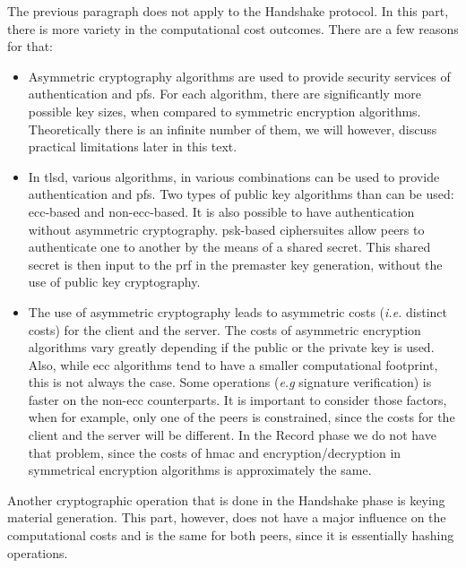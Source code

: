 \documentclass{llncs}
\begin{document}
The previous paragraph does not apply to the Handshake protocol. In this part, there is more variety in the
computational cost outcomes. There are a few reasons for that:

\begin{itemize}

  \item Asymmetric cryptography algorithms are used to provide security services of authentication
  and \gls{pfs}. For each algorithm, there are significantly more possible key sizes, when compared to
  symmetric encryption algorithms. Theoretically there is an infinite number of them, we will however, discuss
  practical limitations later in this text.

  \item In \gls{tlsd}, various algorithms, in various combinations can be used to provide authentication and \gls{pfs}.
  Two types of public key algorithms than can be used: \gls{ecc}-based and non-\gls{ecc}-based. It is also possible
  to have authentication without asymmetric cryptography. \gls{psk}-based ciphersuites allow peers to
  authenticate one to another by the means of a shared secret. This shared secret is then input to the \gls{prf}
  in the premaster key generation, without the use of public key cryptography.

  \item The use of asymmetric cryptography leads to asymmetric costs (\textit{i.e.} distinct costs) for the client and the server. The costs of asymmetric
  encryption algorithms vary greatly depending if the public or the private key is used. Also, while \gls{ecc}
  algorithms tend to have a smaller computational footprint, this is not always the case.
  Some operations (\textit{e.g} signature verification) is faster on the non-\gls{ecc} counterparts.
  It is important to consider those factors, when for example, only one of the peers is constrained, since the costs for the client and the server will be different.
  In the Record phase we do not have that problem, since the costs of \gls{hmac} and encryption/decryption in
  symmetrical encryption algorithms is approximately the same.

\end{itemize}

Another cryptographic operation that is done in the Handshake phase is keying material generation. This part, however,
does not have a major influence on the computational costs and is the same for both peers, since it is essentially
hashing operations.
\end{document}
